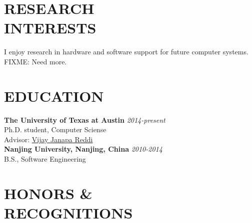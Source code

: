 \documentclass[margin, 9pt]{res} %
\begin{document}
\begin{resume}


\vspace*{-5pt}
\section{RESEARCH\\ INTERESTS} 

I enjoy research in hardware and software support for future computer systems. FIXME: Need more.
 


\section{EDUCATION}

\textbf{The University of Texas at Austin} \hfill\textit{2014-present}\\
Ph.D. student, Computer Sciense\\
Advisor: \href{http://3nity.io/~vj/}{Vijay Janapa Reddi}\\

\vspace*{-5pt}
\textbf{Nanjing University, Nanjing, China} \hfill\textit{2010-2014}\\
B.S., Software Engineering

 
\section{HONORS \&\\ RECOGNITIONS}


\end{resume}
\end{document}
